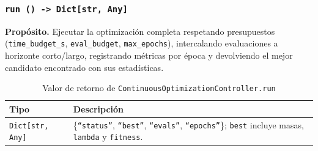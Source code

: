 \subsubsection*{\texttt{run~() -> Dict[str, Any]}}
\textbf{Propósito.} Ejecutar la optimización completa respetando presupuestos (\texttt{time\_budget\_s}, \texttt{eval\_budget}, \texttt{max\_epochs}), intercalando evaluaciones a horizonte corto/largo, registrando métricas por época y devolviendo el mejor candidato encontrado con sus estadísticas.

\begin{table}[H]
  \centering
  \caption{Valor de retorno de \texttt{ContinuousOptimizationController.run}}
  \small
  \begin{tabularx}{\textwidth}{@{}p{}X@{}}
    \toprule
    \textbf{Tipo} & \textbf{Descripción} \\
    \midrule
    \texttt{Dict[str, Any]} & \{\texttt{``status''}, \texttt{``best''}, \texttt{``evals''}, \texttt{``epochs''}\}; \texttt{best} incluye masas, \texttt{lambda} y \texttt{fitness}. \\
    \bottomrule
  \end{tabularx}
\end{table}

